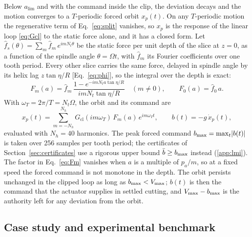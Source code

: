 Below $a_{\lim}$ and with the command inside the clip, the deviation decays and the motion converges to a $T$-periodic forced orbit $x_p(t)$. On any $T$-periodic motion the regenerative term of Eq.~\eqref{eq:split} vanishes, so $x_p$ is the response of the linear loop \eqref{eq:Gcl} to the static force alone, and it has a closed form. Let $\hat f_s(\theta)=\sum_m\hat f_m\,e^{imN_t\theta}$ be the static force per unit depth of the slice at $z=0$, as a function of the spindle angle $\theta=\Omega t$, with $\hat f_m$ its Fourier coefficients over one tooth period. Every other slice carries the same force, delayed in spindle angle by its helix lag $z\tan\eta/R$ [Eq.~\eqref{eq:phi}], so the integral over the depth is exact:
\begin{equation}\label{eq:Fm}
  F_m(a)=\hat f_m\,\frac{1-e^{-imN_ta\tan\eta/R}}{imN_t\tan\eta/R}\quad(m\neq0),\qquad F_0(a)=\hat f_0\,a .
\end{equation}
With $\omega_T=2\pi/T=N_t\Omega$, the orbit and its command are
\begin{equation}\label{eq:xp}
  x_p(t)=\sum_{m=-N_h}^{N_h}G_{\mathrm{cl}}(im\omega_T)\,F_m(a)\,e^{im\omega_Tt},\qquad
  b(t)=-g\,\dot x_p(t),
\end{equation}
evaluated with $N_h=40$ harmonics. The peak forced command $b_{\max}=\max_t\lvert b(t)\rvert$ is taken over 256 samples per tooth period; the certificates of Section~\ref{sec:certificates} use a rigorous upper bound $\bar b\ge b_{\max}$ instead (\ref{app:lmi}). The factor in Eq.~\eqref{eq:Fm} vanishes when $a$ is a multiple of $p_a/m$, so at a fixed speed the forced command is not monotone in the depth. The orbit persists unchanged in the clipped loop as long as $b_{\max}<V_{\max}$; $b(t)$ is then the command that the actuator supplies in settled cutting, and $V_{\max}-b_{\max}$ is the authority left for any deviation from the orbit.

\subsection{Case study and experimental benchmark}\label{sec:model-case}

